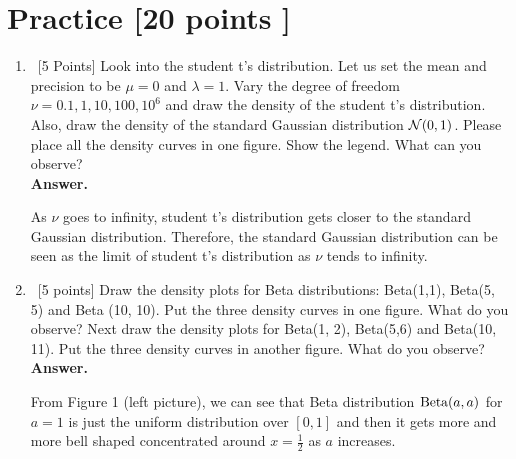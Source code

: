 \documentclass[12pt, fullpage,letterpaper]{article}
\def\red{\color{red}}
\def\blackblue{\color{black!40!blue}}
\begin{document}
\section{Practice [20 points ]}
\begin{enumerate}
	\item~[5 Points] Look into the student t's distribution. Let us set the mean and precision to be $\mu = 0$ and $\lambda = 1$. Vary the degree of freedom $\nu = {0.1, 1, 10, 100, 10^6}$ and draw the density of the student t's distribution. Also, draw the density of the standard Gaussian distribution $\mathcal{N}(0,1)$. Please place all the density curves in one figure. Show the legend. What can you observe?\\
{\red \bf Answer.}{\blackblue 
As $\nu$ goes to infinity, student t's distribution gets closer to the standard Gaussian distribution. Therefore, the standard Gaussian distribution can be seen as the limit of  student t's distribution as $\nu$ tends to infinity. 
\begin{center}	
\begin{minipage}{0.5\textwidth}
 \end{minipage}
 \end{center}
}
\item~[5 points] Draw the density plots for Beta distributions: Beta(1,1), Beta(5, 5) and Beta (10, 10). Put the three density curves in one figure. What do you observe? Next draw the density plots for Beta(1, 2), Beta(5,6) and Beta(10, 11). Put the three density curves in another figure. What do you observe?
{\red \bf Answer. }{\blackblue  
From Figure 1 (left picture), we can see that Beta distribution ${\rm Beta}(a,a)$ for $a=1$ is just the uniform distribution over $[0,1]$ and then it gets more and more bell shaped concentrated around $x=\frac12$ as $a$ increases. 

}
\end{enumerate}
\end{document}
